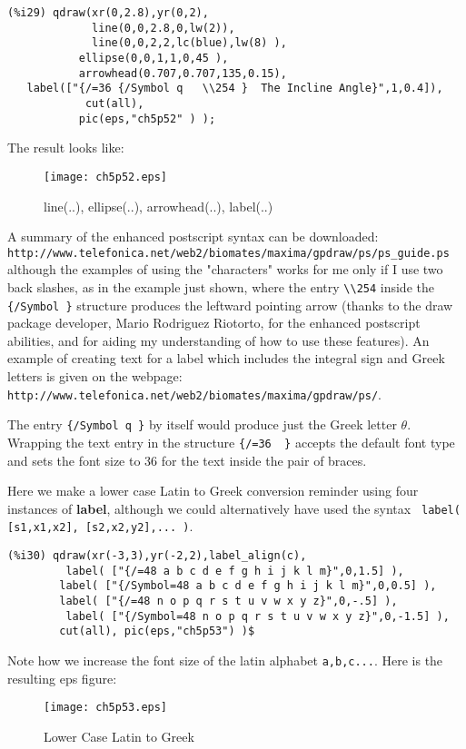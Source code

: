 \documentclass[12pt]{article}
\begin{document}
\smallskip
\small
\begin{verbatim}
(%i29) qdraw(xr(0,2.8),yr(0,2),
             line(0,0,2.8,0,lw(2)),
             line(0,0,2,2,lc(blue),lw(8) ),
           ellipse(0,0,1,1,0,45 ),
           arrowhead(0.707,0.707,135,0.15),
   label(["{/=36 {/Symbol q   \\254 }  The Incline Angle}",1,0.4]),
            cut(all),
           pic(eps,"ch5p52" ) );
\end{verbatim}
\normalsize

The result looks like:
\begin{figure} [h]
   \centerline{\texttt{[image: ch5p52.eps]} }
	\caption{line(..), ellipse(..), arrowhead(..), label(..)}
\end{figure}      

A summary of the enhanced postscript syntax can be downloaded:\\
\verb|http://www.telefonica.net/web2/biomates/maxima/gpdraw/ps/ps_guide.ps |
although the examples of using the "characters" works for me only if
I use two back slashes, as in the example just shown, where the
  entry \verb|\\254| inside the \verb|{/Symbol }| structure produces the leftward
  pointing arrow (thanks to the draw package developer, Mario Rodriguez Riotorto, 
  for the enhanced postscript abilities, and for aiding my understanding of 
  how to use these features).
An example of creating text for a label which includes the integral sign
  and Greek letters is given on the webpage:\\
\verb|http://www.telefonica.net/web2/biomates/maxima/gpdraw/ps/|.  
\smallskip

The entry \verb|{/Symbol q }| by itself would produce just the Greek
  letter $\theta$.
Wrapping the text entry in the structure \verb|{/=36  }| accepts the
  default font type and sets the font size to 36 for the text inside the
  pair of braces.
 
\smallskip
Here we make a lower case Latin to Greek conversion reminder using four instances of
  \textbf{label}, although we could alternatively have used
  the syntax \verb| label( [s1,x1,x2], [s2,x2,y2],... )|.
\small
\begin{verbatim}
(%i30) qdraw(xr(-3,3),yr(-2,2),label_align(c),
         label( ["{/=48 a b c d e f g h i j k l m}",0,1.5] ),
        label( ["{/Symbol=48 a b c d e f g h i j k l m}",0,0.5] ),
        label( ["{/=48 n o p q r s t u v w x y z}",0,-.5] ),
         label( ["{/Symbol=48 n o p q r s t u v w x y z}",0,-1.5] ),   
        cut(all), pic(eps,"ch5p53") )$
\end{verbatim}
\normalsize
Note how we increase the font size of the latin alphabet \verb|a,b,c...|.
Here is the resulting eps figure:
\begin{figure} [h]
   \centerline{\texttt{[image: ch5p53.eps]} }
	\caption{Lower Case Latin to Greek}
\end{figure}      
\end{document}
